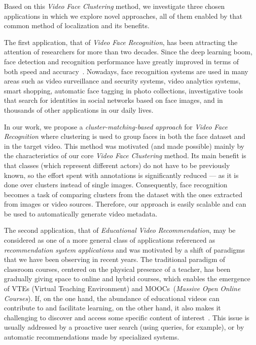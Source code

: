 Based on this \emph{Video Face Clustering} method, we investigate three chosen applications in which we explore novel approaches, all of them enabled by that common method of localization and its benefits. 

The first application, that of \emph{Video Face Recognition}, has been attracting the attention of researchers for more than two decades. Since the deep learning boom, face detection and recognition performance have greatly improved in terms of both speed and accuracy~\cite{masi2018deep}. Nowadays, face recognition systems are used in many areas such as video surveillance and security systems, video analytics systems, smart shopping, automatic face tagging in photo collections, investigative tools that search for identities in social networks based on face images, and in thousands of other applications in our daily lives.

In our work, we propose a \textit{cluster-matching-based approach} for \emph{Video Face Recognition} where clustering is used to group faces in both the face dataset and in the target video. This method was motivated (and made possible) mainly by the characteristics of our core \emph{Video Face Clustering} method. Its main benefit is that classes (which represent different actors) do not have to be previously known, so the effort spent with annotations is significantly reduced --- as it is done over clusters instead of single images. Consequently, face recognition becomes a task of comparing clusters from the dataset with the ones extracted from images or video sources. Therefore, our approach is easily scalable and can be used to automatically generate video metadata.

The second application, that of \emph{Educational Video Recommendation}, may be considered as one of a more general class of applications referenced as \textit{recommendation system applications} and was motivated by a shift of paradigms that we have been observing in recent years. The traditional paradigm of classroom courses, centered on the physical presence of a teacher, has been gradually giving space to online and hybrid courses, which enables the emergence of VTEs (Virtual Teaching Environment) and MOOCs~(\textit{Massive Open Online Courses}).
If, on the one hand, the abundance of educational videos can contribute to and facilitate learning, on the other hand, it also makes it challenging to discover and access some specific content of interest~\cite{dias2017approach}.
This issue is usually addressed by a proactive user search (using queries, for example), or by automatic recommendations made by specialized systems.


